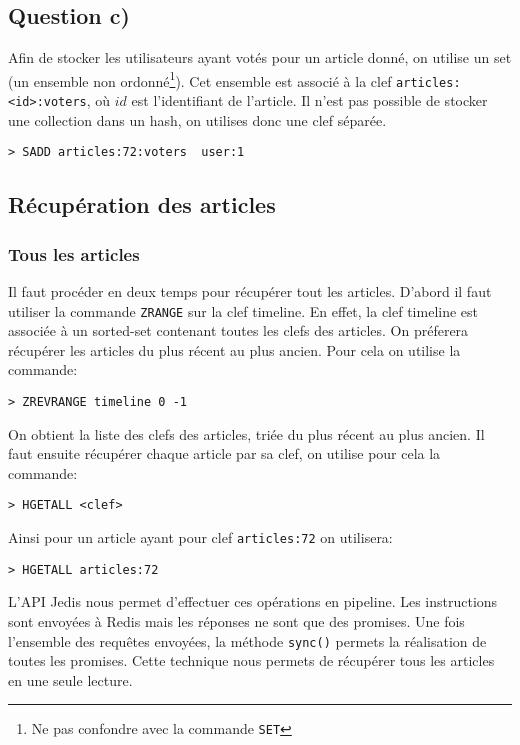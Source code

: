 \documentclass[article,a4paper,12pt]{article}
\begin{document}
\subsection{Question c)}
\label{sec:orgheadline5}

Afin de stocker les utilisateurs ayant votés pour un article donné, on utilise
un set (un ensemble non ordonné\footnote{Ne pas confondre avec la commande
\texttt{SET}}). Cet ensemble est associé à la clef \texttt{articles:<id>:voters}, où \(id\)
est l'identifiant de l'article. Il n'est pas possible de stocker une
collection dans un hash, on utilises donc une clef séparée.

\begin{verbatim}
> SADD articles:72:voters  user:1
\end{verbatim}


\subsection{Récupération des articles}
\label{sec:orgheadline8}
\subsubsection{Tous les articles}
\label{sec:orgheadline6}

Il faut procéder en deux temps pour récupérer tout les articles. D'abord il
faut utiliser la commande \texttt{ZRANGE} sur la clef timeline. En effet, la clef
timeline est associée à un sorted-set contenant toutes les clefs des articles. On
préferera récupérer les articles du plus récent au plus ancien. Pour cela on
utilise la commande:
\begin{verbatim}
> ZREVRANGE timeline 0 -1
\end{verbatim}

On obtient la liste des clefs des articles, triée du plus récent au plus
ancien. Il faut ensuite récupérer chaque article par sa clef, on utilise pour
cela la commande:
\begin{verbatim}
> HGETALL <clef>
\end{verbatim}
Ainsi pour un article ayant pour clef \texttt{articles:72} on utilisera:
\begin{verbatim}
> HGETALL articles:72
\end{verbatim}

L'API Jedis nous permet d'effectuer ces opérations en pipeline. Les
instructions sont envoyées à Redis mais les réponses ne sont que des promises.
Une fois l'ensemble des requêtes envoyées, la méthode \texttt{sync()} permets la
réalisation de toutes les promises. Cette technique nous permets de récupérer
tous les articles en une seule lecture.
\end{document}
